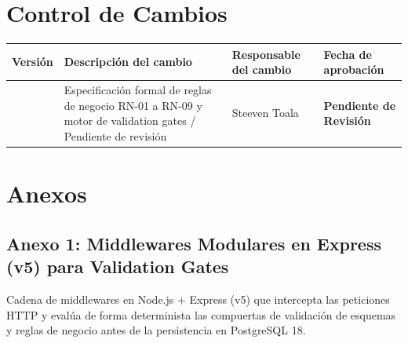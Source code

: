 \documentclass[12pt,a4paper]{article}
\begin{document}
\vspace{0.4cm}

\section{Control de Cambios}

\noindent
\renewcommand{\arraystretch}{1.2}
\begin{tabularx}{\textwidth}{|>{\hsize=0.45\hsize\centering\arraybackslash}X|>{\hsize=1.55\hsize\raggedright\arraybackslash}X|>{\hsize=1.2\hsize\raggedright\arraybackslash}X|>{\hsize=0.8\hsize\centering\arraybackslash}X|}
    \hline
    \rowcolor{tableheader}
    \textbf{Versión} & \textbf{Descripción del cambio} & \textbf{Responsable del cambio} & \textbf{Fecha de aprobación} \\
    \hline
    1.0 & Especificación formal de reglas de negocio RN-01 a RN-09 y motor de validation gates / Pendiente de revisión & Steeven Toala & \textbf{\textcolor{gray!90}{Pendiente de Revisión}} \\
    \hline
\end{tabularx}

\vspace{0.4cm}

\section{Anexos}
\subsection*{Anexo 1: Middlewares Modulares en Express (v5) para Validation Gates}
Cadena de middlewares en Node.js + Express (v5) que intercepta las peticiones HTTP y evalúa de forma determinista las compuertas de validación de esquemas y reglas de negocio antes de la persistencia en PostgreSQL 18.
\end{document}
